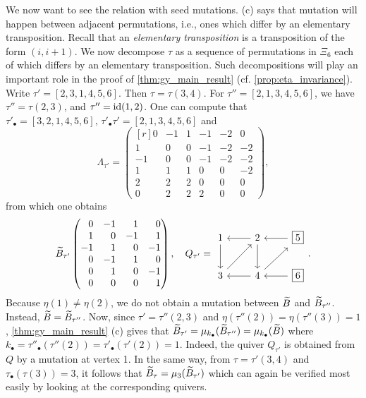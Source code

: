 \begin{example}
	We now want to see the relation with seed mutations.  (c) says
	that mutation will happen between adjacent permutations, i.e., ones which differ by an
	elementary transposition. Recall that an
	\emph{elementary transposition} is a transposition of the form $(i, i+1)$. We now
	decompose $\tau$ as a sequence of permutations in $\Xi_6$ each of which differs by an
	elementary transposition. Such decompositions will play an important role in the proof
	of \cref{thm:gy_main_result} (cf. \cref{prop:eta_invariance}). Write $\tau' =
		[2,3,1,4,5,6]$. Then $\tau = \tau(3,4)$. For $\tau'' = [2,1,3,4,5,6]$, we have $\tau''
		= \tau(2,3)$, and $\tau'' = \operatorname{id} (1,2)$. One can compute that $\tau'_{\bullet} =
			[3,2,1,4,5,6],\, \tau'_\bullet \tau' = [2,1,3,4,5,6]$ and
	\begin{equation*}
		\Lambda_{\tau'} = \begin{pmatrix*}[r]
			0 & -1 & 1 & -1 & -2 & 0\\
			1 & 0 & 0 & -1 & -2 & -2\\
			-1 & 0 & 0 & -1 & -2 & -2\\
			1 & 1 & 1 & 0 & 0 & -2\\
			2 & 2 & 2 & 0 & 0 & 0\\
			0 & 2 & 2 & 2 & 0 & 0
		\end{pmatrix*},
	\end{equation*}
	from which one obtains
	\begin{equation*}
		\tB_{\tau'}
		\begin{pmatrix*}[r]
			0 & -1 & 1 & 0\\
			1 & 0 & -1 & 1\\
			-1 & 1 & 0 & -1\\
			0 & -1 & 1 & 0\\
			0 & 1 & 0 & -1\\
			0 & 0 & 0 & 1
		\end{pmatrix*},
		\quad Q_{\tau'} =
		\begin{tikzcd}
			1 \dar & 2 \lar \dar & \boxed{5} \lar \\
			3 \urar & 4 \lar \urar & \boxed{6} \lar
		\end{tikzcd}
		.
	\end{equation*}
	Because $\eta(1) \neq \eta(2)$, we do not obtain a mutation between $\widetilde{B}$ and
	$\widetilde{B}_{\tau''}$. Instead, $\widetilde{B} = \widetilde{B}_{\tau''}$. Now, since $\tau' = \tau''(2,3)$ and
	$\eta(\tau''(2)) = \eta(\tau''(3)) = 1$, \cref{thm:gy_main_result} (c) gives that
	$\widetilde{B}_{\tau'} = \mu_{k_\bullet}(\widetilde{B}_{\tau''}) = \mu_{k_\bullet}(\widetilde{B})$ where $k_\bullet =
		\tau''_\bullet(\tau''(2)) = \tau'_\bullet(\tau'(2)) = 1$. Indeed, the quiver
	$Q_{\tau'}$ is obtained from $Q$ by a mutation at vertex 1. In the same way, from $\tau
		= \tau'(3,4)$ and $\tau_\bullet(\tau(3)) = 3$, it follows that $\widetilde{B}_\tau =
		\mu_{3}(\widetilde{B}_{\tau'})$ which can again be verified most easily by looking at the
	corresponding quivers.


\end{example}
